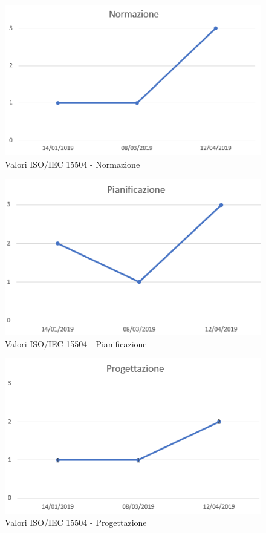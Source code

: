 \begin{figure}[H]
	\centering
	\includegraphics[scale=1]{images/resoconto/Normazione.png}
	\caption{Valori ISO/IEC 15504 - Normazione}	
\end{figure}


\begin{figure}[H]
	\centering
	\includegraphics[scale=1]{images/resoconto/Pianificazione.png}
	\caption{Valori ISO/IEC 15504 - Pianificazione}	
\end{figure}


\begin{figure}[H]
	\centering
	\includegraphics[scale=1]{images/resoconto/Progettazione.png}
	\caption{Valori ISO/IEC 15504 - Progettazione}	
\end{figure}


